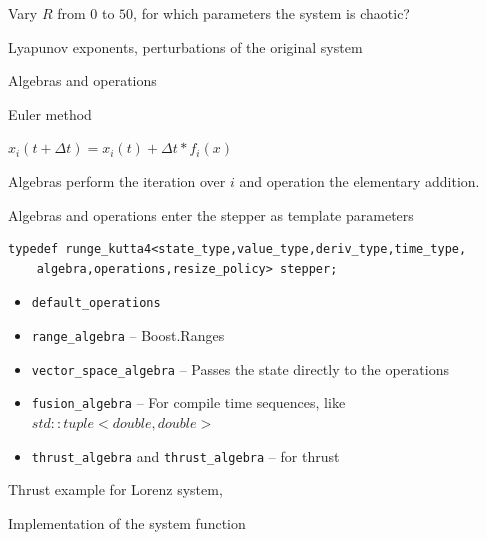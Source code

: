 \begin{frame}[fragile]

Vary $R$ from $0$ to $50$, for which parameters the system is chaotic?

Lyapunov exponents, perturbations of the original system

\end{frame}





\begin{frame}[fragile]

Algebras and operations

Euler method

$ x_i(t+\Delta t) = x_i(t) + \Delta t * f_i(x)$

Algebras perform the iteration over $i$ and operation the elementary addition.

Algebras and operations enter the stepper as template parameters

\begin{lstlisting}
typedef runge_kutta4<state_type,value_type,deriv_type,time_type,
    algebra,operations,resize_policy> stepper; 
\end{lstlisting}

\begin{itemize}
 \item {\tt default\_operations}
 \item {\tt range\_algebra} -- Boost.Ranges
 \item {\tt vector\_space\_algebra} -- Passes the state directly to the operations
 \item {\tt fusion\_algebra} -- For compile time sequences, like $std::tuple< double , double >$
 \item {\tt thrust\_algebra} and {\tt thrust\_algebra} -- for thrust
\end{itemize}

\end{frame}


\begin{frame}[fragile]

Thrust example for Lorenz system,

Implementation of the system function 

\end{frame}











